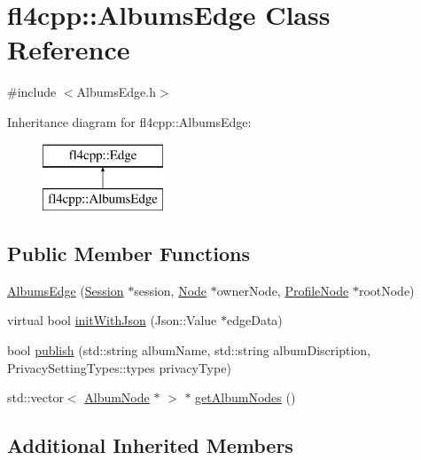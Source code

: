 \hypertarget{classfl4cpp_1_1_albums_edge}{}\section{fl4cpp\+:\+:Albums\+Edge Class Reference}
\label{classfl4cpp_1_1_albums_edge}


{\ttfamily \#include $<$Albums\+Edge.\+h$>$}

Inheritance diagram for fl4cpp\+:\+:Albums\+Edge\+:\begin{figure}[H]
\begin{center}
\leavevmode
\includegraphics[height=2.000000cm]{classfl4cpp_1_1_albums_edge}
\end{center}
\end{figure}
\subsection*{Public Member Functions}
\begin{DoxyCompactItemize}
\item 
\hyperlink{classfl4cpp_1_1_albums_edge_a149d580023d47bd1560cc542e856b105}{Albums\+Edge} (\hyperlink{classfl4cpp_1_1_session}{Session} $\ast$session, \hyperlink{classfl4cpp_1_1_node}{Node} $\ast$owner\+Node, \hyperlink{classfl4cpp_1_1_profile_node}{Profile\+Node} $\ast$root\+Node)
\item 
virtual bool \hyperlink{classfl4cpp_1_1_albums_edge_aa240275cb49531a23ab2d08ca64b5dcb}{init\+With\+Json} (Json\+::\+Value $\ast$edge\+Data)
\item 
bool \hyperlink{classfl4cpp_1_1_albums_edge_acca68bf8f4b114e648dfaf70f7eaa3aa}{publish} (std\+::string album\+Name, std\+::string album\+Discription, Privacy\+Setting\+Types\+::types privacy\+Type)
\item 
std\+::vector$<$ \hyperlink{classfl4cpp_1_1_album_node}{Album\+Node} $\ast$ $>$ $\ast$ \hyperlink{classfl4cpp_1_1_albums_edge_a9b7913d0d98a1d3e73426be0eaeeecf8}{get\+Album\+Nodes} ()
\end{DoxyCompactItemize}
\subsection*{Additional Inherited Members}


